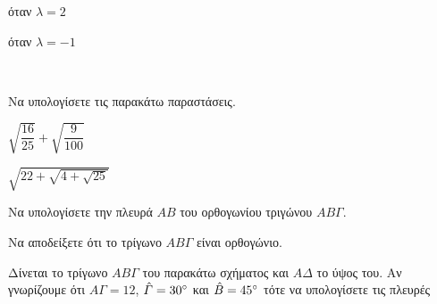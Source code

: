 \documentclass[twoside,nofonts,internet,math,spyros]{frontisthrio-diag}
\begin{document}
\begin{thema}
\begin{erwthma}
\begin{multicols}{2}
\begin{alist}
\item όταν $ \lambda=2 $
\item όταν $ \lambda=-1 $
\end{alist}
\end{multicols}
\end{erwthma}
\item \mbox{}\\\vspace{-5mm}
\begin{erwthma}
\item 
Να υπολογίσετε τις παρακάτω παραστάσεις.
\begin{multicols}{2}
\begin{alist}
\item $ \sqrt{\dfrac{16}{25}}+\sqrt{\dfrac{9}{100}} $
\item $ \sqrt{22+\sqrt{4+\sqrt{25}}} $
\end{alist}
\end{multicols}
\item 
\begin{alist}
\item Να υπολογίσετε την πλευρά $ AB $ του ορθογωνίου τριγώνου $ AB\varGamma $.
\begin{center}
\end{center}
\item Να αποδείξετε ότι το τρίγωνο $ AB\varGamma $ είναι ορθογώνιο.
\begin{center}
\end{center}
\end{alist}
\item Δίνεται το τρίγωνο $ AB\varGamma $ του παρακάτω σχήματος και $ A\varDelta $ το ύψος του. Αν γνωρίζουμε ότι $ A\varGamma=12 $, $ \hat{\varGamma}=30\degree $ και $ \hat{B}=45\degree $ τότε να υπολογίσετε τις πλευρές

\end{erwthma}
\end{thema}
\end{document}
